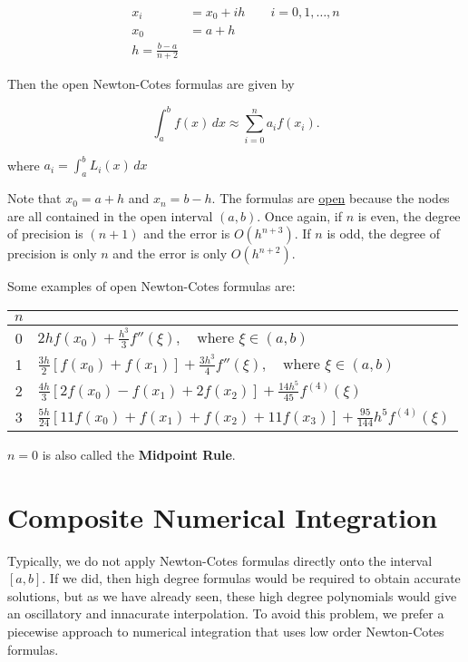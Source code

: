 \begin{align*}
x_i &= x_0+ih \qquad i = 0,1,\dots,n \\
x_0 &= a+h \\
h = \frac{b-a}{n+2}
\end{align*}

Then the open Newton-Cotes formulas are given by

\begin{equation}
  \int_{a}^{b} f(x) \, dx \approx \sum_{i = 0}^{n} a_if(x_i) 
.\end{equation}

where $\displaystyle a_i = \int_{a}^{b} L_i(x) \, dx$

Note that $x_0 = a+h$ and $x_n = b-h$. The formulas are \uline{open} because the
nodes are all contained in the open interval $(a,b)$. Once again, if $n$ is even,
the degree of precision is $(n+1)$ and the error is $O(h^{n+3})$. If $n$ is odd,
the degree of precision is only $n$ and the error is only $O(h^{n+2})$.

Some examples of open Newton-Cotes formulas are:

\begin{tabular}{c| l}
    $n$ & \\
    \hline
    0 & $\displaystyle 2h f(x_0) + \frac{h^3}{3} f''(\xi), \quad \text{where } \xi \in (a,b)$ \\[10pt]
    1 & $\displaystyle \frac{3h}{2} \left[ f(x_0) + f(x_1) \right] + \frac{3h^3}{4} f''(\xi), \quad \text{where } \xi \in (a,b)$ \\[10pt]
    2 & $\displaystyle \frac{4h}{3} \left[ 2f(x_0) - f(x_1) + 2f(x_2) \right] + \frac{14h^5}{45} f^{(4)}(\xi)$ \\[10pt]
    3 & $\displaystyle \frac{5h}{24} \left[ 11f(x_0) + f(x_1) + f(x_2) + 11f(x_3) \right] + \frac{95}{144} h^5 f^{(4)}(\xi)$ \\
\end{tabular}

$n=0$ is also called the \textbf{Midpoint Rule}. 

\section{Composite Numerical Integration}
\label{sec:composite_numerical_integration}
Typically, we do not apply Newton-Cotes formulas directly onto the interval
$[a,b]$. If we did, then high degree formulas would be required to obtain
accurate solutions, but as we have already seen, these high degree polynomials
would give an oscillatory and innacurate interpolation. To avoid this problem,
we prefer a piecewise approach to numerical integration that uses low order
Newton-Cotes formulas.

